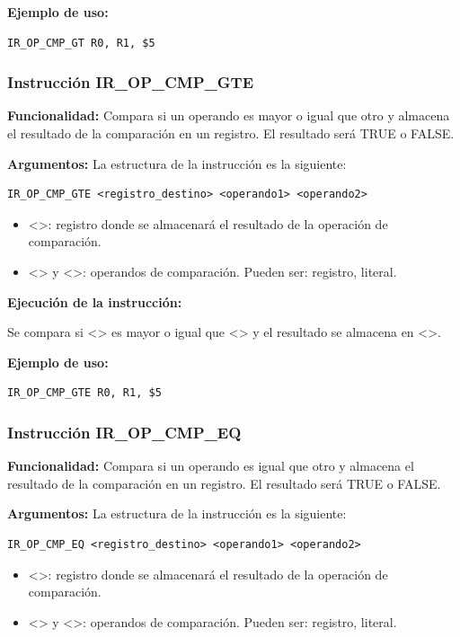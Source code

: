 \noindent
\textbf{Ejemplo de uso:}
\begin{verbatim}
IR_OP_CMP_GT R0, R1, $5
\end{verbatim}

\subsubsection{Instrucción IR\_OP\_CMP\_GTE}\label{subsubsec:IR_OP_CMP_GTE}
\noindent
\textbf{Funcionalidad:} Compara si un operando es mayor o igual que otro y almacena el resultado de la comparación en un registro. El resultado será TRUE o FALSE.

\noindent
\textbf{Argumentos:} La estructura de la instrucción es la siguiente:
\begin{verbatim}
IR_OP_CMP_GTE <registro_destino> <operando1> <operando2>
\end{verbatim}
\begin{itemize}
    \item <>: registro donde se almacenará el resultado de la operación de comparación.
    \item <> y <>: operandos de comparación. Pueden ser: registro, literal.
\end{itemize}

\noindent
\textbf{Ejecución de la instrucción:}
\vspace{0.3cm}

\noindent
Se compara si <> es mayor o igual que <> y el resultado se almacena en <>.
\vspace{0.3cm}

\noindent
\textbf{Ejemplo de uso:}
\begin{verbatim}
IR_OP_CMP_GTE R0, R1, $5
\end{verbatim}


\subsubsection{Instrucción IR\_OP\_CMP\_EQ}\label{subsubsec:IR_OP_CMP_EQ}
\noindent
\textbf{Funcionalidad:} Compara si un operando es igual que otro y almacena el resultado de la comparación en un registro. El resultado será TRUE o FALSE.

\noindent
\textbf{Argumentos:} La estructura de la instrucción es la siguiente:
\begin{verbatim}
IR_OP_CMP_EQ <registro_destino> <operando1> <operando2>
\end{verbatim}
\begin{itemize}
    \item <>: registro donde se almacenará el resultado de la operación de comparación.
    \item <> y <>: operandos de comparación. Pueden ser: registro, literal.
\end{itemize}

